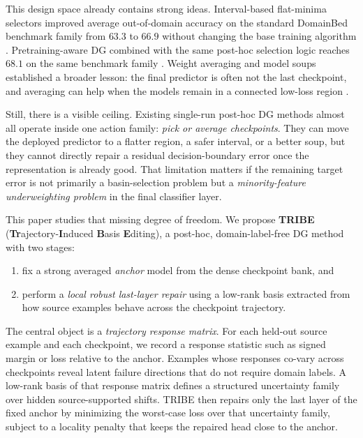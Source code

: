 \documentclass{article}
\newcommand{\tribe}{\textup{\textsc{TRIBE}}}
\newcommand{\1}{\mathbbm{1}}
\begin{document}
This design space already contains strong ideas. Interval-based flat-minima selectors improved average out-of-domain accuracy on the standard DomainBed benchmark family from \(63.3\) to \(66.9\) without changing the base training algorithm \citep{cha2021swad}. Pretraining-aware DG combined with the same post-hoc selection logic reaches \(68.1\) on the same benchmark family \citep{cha2022miro}. Weight averaging and model soups established a broader lesson: the final predictor is often not the last checkpoint, and averaging can help when the models remain in a connected low-loss region \citep{izmailov2018swa,frankle2020linear,wortsman2022soups,rame2022diwa}.

Still, there is a visible ceiling. Existing single-run post-hoc DG methods almost all operate inside one action family: \emph{pick or average checkpoints}. They can move the deployed predictor to a flatter region, a safer interval, or a better soup, but they cannot directly repair a residual decision-boundary error once the representation is already good. That limitation matters if the remaining target error is not primarily a basin-selection problem but a \emph{minority-feature underweighting problem} in the final classifier layer.

This paper studies that missing degree of freedom. We propose \textbf{\tribe{}} (\textbf{Tr}ajectory-\textbf{I}nduced \textbf{B}asis \textbf{E}diting), a post-hoc, domain-label-free DG method with two stages:
\begin{enumerate}[leftmargin=1.4em]
    \item fix a strong averaged \emph{anchor} model from the dense checkpoint bank, and
    \item perform a \emph{local robust last-layer repair} using a low-rank basis extracted from how source examples behave across the checkpoint trajectory.
\end{enumerate}

The central object is a \emph{trajectory response matrix}. For each held-out source example and each checkpoint, we record a response statistic such as signed margin or loss relative to the anchor. Examples whose responses co-vary across checkpoints reveal latent failure directions that do not require domain labels. A low-rank basis of that response matrix defines a structured uncertainty family over hidden source-supported shifts. \tribe{} then repairs only the last layer of the fixed anchor by minimizing the worst-case loss over that uncertainty family, subject to a locality penalty that keeps the repaired head close to the anchor.
\end{document}
